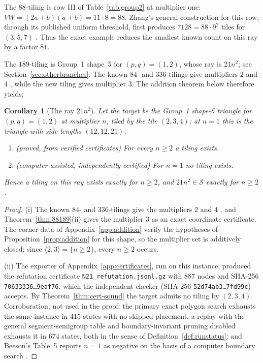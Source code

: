 \documentclass[11pt]{amsart}
\newtheorem{corollary}[theorem]{Corollary}
\theoremstyle{definition}
\theoremstyle{remark}
\newcommand{\Sset}{\mathcal S}
\newcommand{\pathcode}[1]{\nolinkurl{#1}}
\begin{document}
The $88$-tiling is row III of Table~\ref{tab:group2} at multiplier one:
$VW=(2a+b)(a+b)=11\cdot8=88$.  Zhang's general construction for this row,
through its published uniform threshold, first produces $7128=88\cdot9^2$
tiles for $(3,5,7)$ \cite{Zhang25}.  Thus the exact example reduces the
smallest known count on this ray by a factor $81$.

The $189$-tiling is Group~1 shape~5 for $(p,q)=(1,2)$, whose ray is
$21n^2$; see Section~\ref{sec:otherbranches}.  The known $84$- and
$336$-tilings give multipliers $2$ and $4$ \cite{Beeson2229}, while the new
tiling gives multiplier $3$.  The addition theorem below therefore yields:

\begin{corollary}[The ray $21n^2$]\label{cor:21ray}
Let the target be the Group~1 shape-5 triangle for $(p,q)=(1,2)$ at
multiplier $n$, tiled by the tile $(2,3,4)$; at $n=1$ this is the triangle
with side lengths $(12,12,21)$.
\begin{enumerate}[label=\textup{(\roman*)}]
\item \textup{(proved, from verified certificates)} For every $n\ge2$ a
      tiling exists.
\item \textup{(computer-assisted, independently certified)} For $n=1$ no
      tiling exists.
\end{enumerate}
Hence a tiling on this ray exists exactly for $n\ge2$, and
$21n^2\in\Sset$ exactly for $n\ge2$.
\end{corollary}

\begin{proof}
(i) The known $84$- and $336$-tilings give the multipliers $2$ and $4$
\cite{Beeson2229}, and Theorem~\ref{thm:88189}(ii) gives the multiplier $3$
as an exact coordinate certificate.  The corner data of
Appendix~\ref{app:addition} verify the hypotheses of
Proposition~\ref{prop:addition} for this shape, so the multiplier set is
additively closed; since $\langle2,3\rangle=\{n\ge2\}$, every $n\ge2$ occurs.

(ii) The exporter of Appendix~\ref{app:certificates}, run on this instance,
produced the refutation certificate \pathcode{N21_refutation.jsonl.gz} with
$887$ nodes and SHA-256 \texttt{70633336\ldots9eaf76}, which the independent
checker (SHA-256 \texttt{52d74ab3\ldots7fd99c}) accepts.  By
Theorem~\ref{thm:cert-sound} the target admits no tiling by $(2,3,4)$.
Corroboration, not used in the proof: the primary exact polygon search
exhausts the same instance in $415$ states with no skipped placement, a
replay with the general segment-semigroup table and boundary-invariant
pruning disabled exhausts it in $674$ states, both in the sense of
Definition~\ref{def:runstatus}; and Beeson's
Table~5 reports $n=1$ as negative on the basis of a computer boundary
search \cite{Beeson2229}.
\end{proof}
\end{document}
